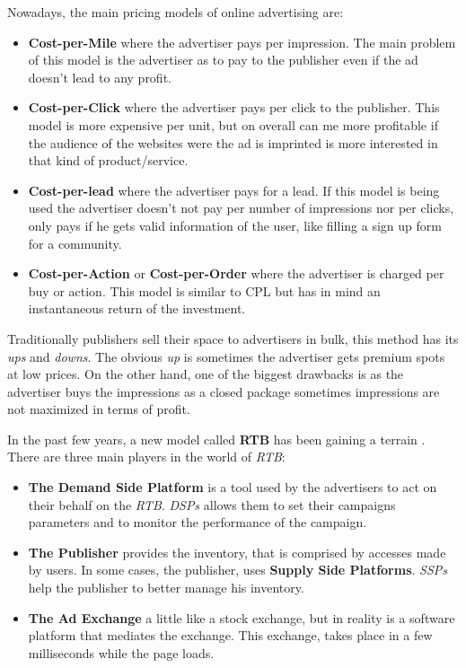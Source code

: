 Nowadays, the main pricing models of online advertising are:
\begin{itemize}
\item\textbf{Cost-per-Mile} where the advertiser pays per impression. The main problem of this model is the advertiser as to pay to the publisher even
if the ad doesn't lead to any profit.
\item\textbf{Cost-per-Click} where the advertiser pays per click to the publisher. This model is more expensive per unit\cite{Performics}, but on overall can me more
profitable\cite{Performics} if the audience of the websites were the ad is imprinted is more interested in that kind of product/service\cite{Andrea2004}.
\item\textbf{Cost-per-lead} where the advertiser pays for a lead. If this model is being used the advertiser doesn't not pay per number of impressions nor per clicks,
only pays if he gets valid information of the user, like filling a sign up form for a community.
\item\textbf{Cost-per-Action} or \textbf{Cost-per-Order} where the advertiser is charged per buy or action. This model is similar to CPL but has in mind an instantaneous return of
the investment.
\end{itemize}

Traditionally publishers sell their space to advertisers in bulk, this method has its \textit{ups} and \textit{downs}. The obvious \textit{up} is sometimes the
advertiser gets premium spots at low prices. On the other hand, one of the biggest drawbacks is as the advertiser buys the impressions as a
closed package sometimes impressions are not maximized in terms of profit.

In the past few years, a new model called \textbf{RTB} has been gaining a terrain \cite{Adfonic}. 
There are three main players in the world of \emph{RTB}:
\begin{itemize}
\item\textbf{The Demand Side Platform} is a tool used by the advertisers to act on their behalf on the \emph{RTB}. \emph{DSPs} allows them to set
their campaigns parameters and to monitor the performance of the campaign.
\item\textbf{The Publisher} provides the inventory, that is comprised by accesses made by users. In some cases, the publisher, uses \textbf{Supply Side Platforms}.
\emph{SSPs} help the publisher to better manage his inventory.
\item\textbf{The Ad Exchange} a little like a stock exchange, but in reality is a software platform that mediates the exchange. This exchange, takes place in
a few milliseconds while the page loads.
\end{itemize}

